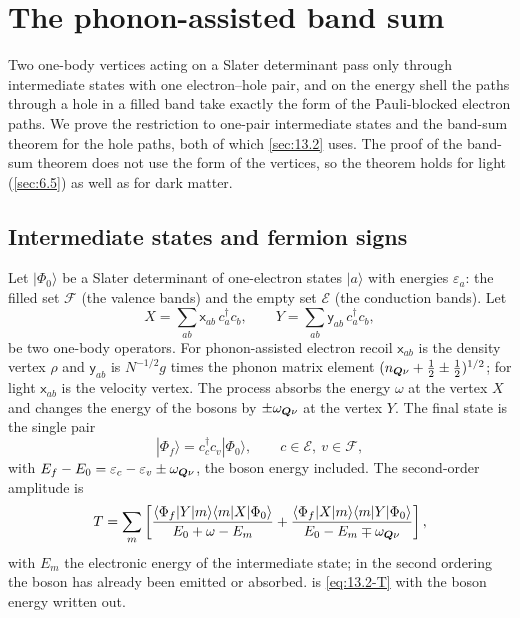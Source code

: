 \section{The phonon-assisted band sum}\label{app:D.35}

Two one-body vertices acting on a Slater determinant pass only through intermediate states with one electron--hole pair, and on the energy shell the paths through a hole in a filled band take exactly the form of the Pauli-blocked electron paths. We prove the restriction to one-pair intermediate states and the band-sum theorem for the hole paths, both of which \cref{sec:13.2} uses. The proof of the band-sum theorem does not use the form of the vertices, so the theorem holds for light (\cref{sec:6.5}) as well as for dark matter.

\subsection*{Intermediate states and fermion signs}

Let $|\Phi_0\rangle$ be a Slater determinant of one-electron states $|a\rangle$ with energies $\varepsilon_a$: the filled set $\mathcal{F}$ (the valence bands) and the empty set $\mathcal{E}$ (the conduction bands). Let
\begin{equation*}
  X = \sum_{ab}\mathsf{x}_{ab}\,c^\dagger_ac_b , \qquad Y = \sum_{ab}\mathsf{y}_{ab}\,c^\dagger_ac_b ,
\end{equation*}
be two one-body operators. For phonon-assisted electron recoil $\mathsf{x}_{ab}$ is the density vertex $\rho$ and $\mathsf{y}_{ab}$ is $N^{-1/2}g$ times the phonon matrix element $(n_{\bm{Q}\nu} + \frac12 \pm \frac12)^{1/2}$; for light $\mathsf{x}_{ab}$ is the velocity vertex. The process absorbs the energy $\omega$ at the vertex $X$ and changes the energy of the bosons by $\pm\omega_{\bm{Q}\nu}$ at the vertex $Y$. The final state is the single pair
\begin{equation*}
  |\Phi_f\rangle = c^\dagger_cc_v|\Phi_0\rangle , \qquad c\in\mathcal{E},\ v\in\mathcal{F},
\end{equation*}
with $E_f - E_0 = \varepsilon_c - \varepsilon_v \pm \omega_{\bm{Q}\nu}$, the boson energy included. The second-order amplitude is
\begin{equation}
  T = \sum_m\left[\frac{\langle\Phi_f|Y|m\rangle\langle m|X|\Phi_0\rangle}{E_0 + \omega - E_m} + \frac{\langle\Phi_f|X|m\rangle\langle m|Y|\Phi_0\rangle}{E_0 - E_m \mp \omega_{\bm{Q}\nu}}\right] ,
  \label{eq:D.35-T}
\end{equation}
with $E_m$ the electronic energy of the intermediate state; in the second ordering the boson has already been emitted or absorbed.  is \cref{eq:13.2-T} with the boson energy written out.

